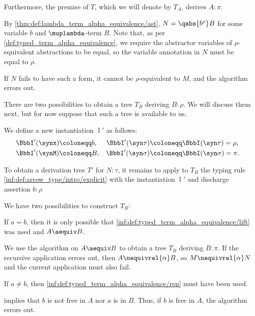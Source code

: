 \begin{algorithm}
\begin{thmenum}
    Furthermore, the premise of \( T \), which we will denote by \( T_A \), derives \( A: \pi \).

    By \cref{thm:def:lambda_term_alpha_equivalence/ast}, \( N = \qabs {b^\rho} B \) for some variable \( b \) and \( \muplambda \)-term \( B \). Note that, as per \cref{def:typed_term_alpha_equivalence}, we require the abstractor variables of \( \rho \)-equivalent abstractions to be equal, so the variable annotation in \( N \) must be equal to \( \rho \).

    If \( N \) fails to have such a form, it cannot be \( \rho \)-equivalent to \( M \), and the algorithm errors out.

    There are two possibilities to obtain a tree \( T_B \) deriving \( B: \rho \). We will discuss them next, but for now suppose that such a tree is available to us.

    We define a new instantiation \( \BbbI' \) as follows:
    \begin{align*}
      \BbbI'(\synx) &\coloneqq b, &\BbbI'(\syn\tau) &\coloneqq \BbbI(\syn\tau) = \rho, \\
      \BbbI'(\synM) &\coloneqq B, &\BbbI'(\syn\sigma) &\coloneqq \BbbI(\syn\sigma) = \pi.
    \end{align*}

    To obtain a derivation tree \( T' \) for \( N: \tau \), it remains to apply to \( T_B \) the typing rule \ref{inf:def:arrow_type/intro/explicit} with the instantiation \( \BbbI' \) and discharge assertion \( b: \rho \)

    We have two possibilities to construct \( T_B \):
    \begin{thmenum}
       If \( a = b \), then it is only possible that \ref{inf:def:typed_term_alpha_equivalence/lift} was used and \( A \aequiv B \).

      We use the algorithm on \( A \aequiv B \) to obtain a tree \( T_B \) deriving \( B: \pi \). If the recursive application errors out, then \( A \nequivrel{\alpha} B \), so \( M \nequivrel{\alpha} N \) and the current application must also fail.

       If \( a \neq b \), then \ref{inf:def:typed_term_alpha_equivalence/ren} must have been used.

       implies that \( b \) is not free in \( A \) nor \( a \) is in \( B \). Thus, if \( b \) is free in \( A \), the algorithm errors out.


\end{thmenum}
\end{thmenum}
\end{algorithm}
